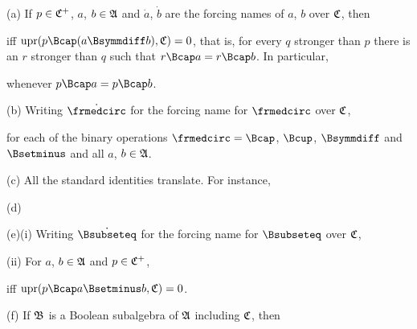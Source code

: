(a) If $p\in\frak C^+$, $a$, $b\in\frak A$ and $\dot a$, $\dot b$ are the
forcing names of $a$, $b$ over $\frak C$, then


\noindent iff $\upr(p\Bcap(a\Bsymmdiff b),\frak C)=0$, that is,
for every $q$
stronger than $p$ there is an $r$ stronger than $q$ such that
$r\Bcap a=r\Bcap b$.   In particular,


\noindent whenever $p\Bcap a=p\Bcap b$.

(b) Writing $\dot\frmedcirc$ for the forcing name for $\frmedcirc$ over $\frak C$,


\noindent for each of the binary
operations $\frmedcirc=\Bcap$, $\Bcup$, $\Bsymmdiff$
and $\Bsetminus$ and all $a$, $b\in\frak A$.

(c) All the standard identities translate.   For instance,


(d)


(e)(i) Writing $\dot{\Bsubseteq}$ for the forcing name for $\Bsubseteq$
over $\frak C$,


\quad(ii) For $a$, $b\in\frak A$ and $p\in\frak C^+$,


\noindent iff $\upr(p\Bcap a\Bsetminus b,\frak C)=0$.

(f) If $\frak B$ is a Boolean subalgebra of $\frak A$ including $\frak C$,
then


